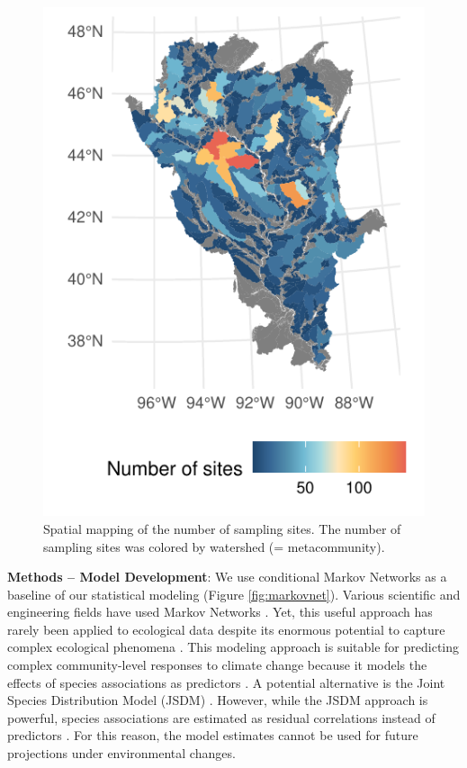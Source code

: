 \documentclass[12pt, class=article, crop=false]{standalone}
\begin{document}
\begin{figure}
    \includegraphics[scale=0.55]{output/fig_fishmap.pdf}
    \caption{Spatial mapping of the number of sampling sites. The number of sampling sites was colored by watershed (= metacommunity).}
    \label{fig:fishmap}
\end{figure}

\textbf{Methods -- Model Development}: We use conditional Markov Networks as a baseline of our statistical modeling (Figure \ref{fig:markovnet}).
Various scientific and engineering fields have used Markov Networks \citep{cheng_sparse_2014}.
Yet, this useful approach has rarely been applied to ecological data despite its enormous potential to capture complex ecological phenomena \citep{harris_inferring_2016, clark_unravelling_2018}.
This modeling approach is suitable for predicting complex community-level responses to climate change because it models the effects of species associations as predictors \citep{cheng_sparse_2014, harris_inferring_2016, clark_unravelling_2018}.
A potential alternative is the Joint Species Distribution Model (JSDM) \citep{warton_so_2015, ovaskainen_how_2017, pollock_understanding_2014}. However, while the JSDM approach is powerful, species associations are estimated as residual correlations instead of predictors \citep{ovaskainen_how_2017}.
For this reason, the model estimates cannot be used for future projections under environmental changes.
\end{document}
